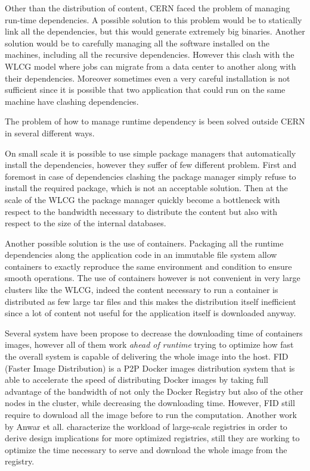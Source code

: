 Other than the distribution of content, CERN faced the problem of managing
run-time dependencies. A possible solution to this problem would be to
statically link all the dependencies, but this would generate extremely big
binaries.  Another solution would be to carefully managing all the software
installed on the machines, including all the recursive dependencies. However this
clash with the WLCG model where jobs can migrate from a data center to another
along with their dependencies.  Moreover sometimes even a very careful
installation is not sufficient since it is possible that two application that
could run on the same machine have clashing dependencies.

The problem of how to manage runtime dependency is been solved outside CERN in
several different ways.

On small scale it is possible to use simple package managers that automatically
install the dependencies, however they suffer of few different problem. First
and foremost in case of dependencies clashing the package manager simply refuse
to install the required package, which is not an acceptable solution. Then at
the scale of the WLCG the package manager quickly become a bottleneck with
respect to the bandwidth necessary to distribute the content but also with
respect to the size of the internal databases.

Another possible solution is the use of containers. Packaging all the runtime
dependencies along the application code in an immutable file system allow
containers to exactly reproduce the same environment and condition to ensure
smooth operations. The use of containers however is not convenient in very
large clusters like the WLCG, indeed the content necessary to run a container
is distributed as few large tar files and this makes the distribution itself
inefficient since a lot of content not useful for the application itself is
downloaded anyway. 

Several system have been propose to decrease the downloading time of containers
images, however all of them work \textit{ahead of runtime} trying to optimize
how fast the overall system is capable of delivering the whole image into
the host. FID (Faster Image Distribution) \cite{FID} is a P2P Docker images
distribution system that is able to accelerate the speed of distributing Docker
images by taking full advantage of the bandwidth of not only the Docker
Registry but also of the other nodes in the cluster, while decreasing the
downloading time. However,  FID still require to download all the image before to run the
computation. Another work by Anwar et all. \cite{210500} characterize the
workload of large-scale registries in order to derive design implications for
more optimized registries, still they are working to optimize the time necessary
to serve and download the whole image from the registry.

